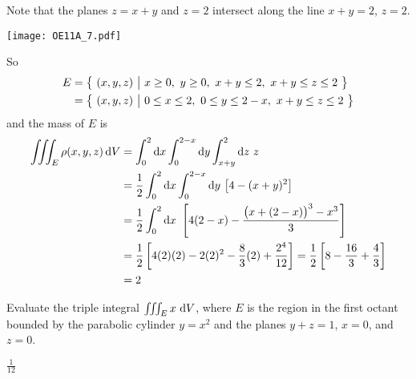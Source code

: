 \begin{solution}
Note that the planes $z = x + y$ and $z = 2$ intersect along the line
$x+y=2$, $z=2$. 

\begin{center}
     \texttt{[image: OE11A\_7.pdf]}
\end{center}

So
\begin{align*}
E &=\big\{ \ (x,y,z)\ \big|\ x\ge 0,\ y\ge 0,\ x+y\le 2,\ x+y\le z\le 2\ \big\} \\
  &= \big\{ \ (x,y,z)\ \big|\ 0\le x\le 2,\ 0\le y\le 2-x,\ x+y\le z\le 2\ \big\} 
\end{align*}
and the mass of $E$ is
\begin{align*}
\tripInt_E \rho(x,y,z)\,\dee{V}
&=\int_0^2\dee{x} \int_0^{2-x}\dee{y} \int_{x+y}^2\dee{z}\ z \\
&=\frac{1}{2}\int_0^2\dee{x} \int_0^{2-x}\dee{y} \ \big[4-(x+y)^2\big] \\
&=\frac{1}{2}\int_0^2\dee{x}\ 
              \left[4(2-x)-\frac{\big(x+(2-x)\big)^3-x^3}{3}\right] \\
&=\frac{1}{2}  \left[4(2)(2)-2(2)^2 -\frac{8}{3}(2)+\frac{2^4}{12}
              \right]
=\frac{1}{2}  \left[8 -\frac{16}{3}+\frac{4}{3}
              \right] \\
&=2
\end{align*}
\end{solution}

\begin{question}[M200 2011D] %
Evaluate the triple integral $\tripInt_E x\ \dee{V}$, where $E$ is 
the region in the first octant bounded by the parabolic cylinder $y = x^2$ 
and the planes $y + z = 1$, $x = 0$, and $z = 0$.
\end{question}

%

\begin{answer}
$\frac{1}{12}$
\end{answer}

